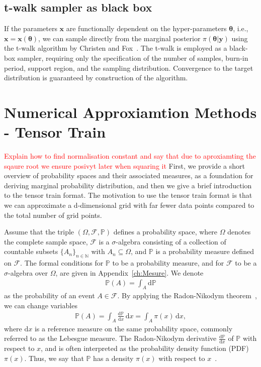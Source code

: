 \subsection{t-walk sampler as black box}
If the parameters $\bm{x}$ are functionally dependent on the hyper-parameters $\bm{\theta}$, i.e., $\bm{x} = \bm{x}(\bm{\theta})$, we can sample directly from the marginal posterior $\pi(\bm{\theta} | \bm{y})$ using the t-walk algorithm by Christen and Fox~\cite{christen2010general}. 
The t-walk is employed as a black-box sampler, requiring only the specification of the number of samples, burn-in period, support region, and the sampling distribution. 
Convergence to the target distribution is guaranteed by construction of the algorithm.

\section{Numerical Approxiamtion Methods - Tensor Train}
\label{sec:tensortrain}
\textcolor{red}{Explain how to find normalisation constant and say that due to aproxiamting the sqaure root we ensure posivyt later when squaring it}
First, we provide a short overview of probability spaces and their associated measures, as a foundation for deriving marginal probability distribution, and then we give a brief introduction to the tensor train format.
The motivation to use the tensor train format is that we can approximate a d-dimensional grid with far fewer data points compared to the total number of grid points.

Assume that the triple $(\Omega, \mathcal{F}, \mathbb{P})$ defines a probability space, where $\Omega$ denotes the complete sample space, $\mathcal{F}$ is a $\sigma$-algebra consisting of a collection of countable subsets $\{A_n\}_{n \in \mathbb{N}}$ with $A_n \subseteq \Omega$, and $\mathbb{P}$ is a probability measure defined on $\mathcal{F}$. The formal conditions for $\mathbb{P}$ to be a probability measure, and for $\mathcal{F}$ to be a $\sigma$-algebra over $\Omega$, are given in Appendix~\ref{ch:Mesure}.
We denote
\begin{align}
	\mathbb{P}(A) = \int_A \mathrm{d} \mathbb{P}
\end{align}
as the probability of an event $A \in \mathcal{F}$.
By applying the Radon-Nikodym theorem~\cite{kopp2004measintprob}, we can change variables
\begin{align}
	\mathbb{P}(A) = \int_A \frac{\mathrm{d} \mathbb{P}}{\mathrm{d}x} \, \mathrm{d}x = \int_A \pi(x) \, \mathrm{d}x,
\end{align}
where $\mathrm{d}x$ is a reference measure on the same probability space, commonly referred to as the Lebesgue measure. 
The Radon-Nikodym derivative $\frac{\mathrm{d} \mathbb{P}}{\mathrm{d}x}$ of $\mathbb{P}$ with respect to $x$, and is often interpreted as the probability density function (PDF) $\pi(x)$. Thus, we say that $\mathbb{P}$ has a density $\pi(x)$ with respect to $x$~\cite[Chapter 10]{simonnet1996measprob}.

